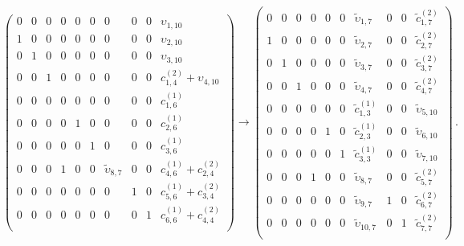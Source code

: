 \documentclass[10pt]{article}
\theoremstyle{definition}
\numberwithin{equation}{section}
\begin{document}
\begin{equation}
	\begin{pmatrix}
		0 & 0 & 0 & 0 & 0 & 0 & 0 & 0 & 0 & \upsilon _{1,10} \\
		1 & 0 & 0 & 0 & 0 & 0 & 0 & 0 & 0 & \upsilon _{2,10} \\
		0 & 1 & 0 & 0 & 0 & 0 & 0 & 0 & 0 & \upsilon _{3,10} \\
		0 & 0 & 1 & 0 & 0 & 0 & 0 & 0 & 0 & c_{1,4}^{(2)}+\upsilon _{4,10} \\
		0 & 0 & 0 & 0 & 0 & 0 & 0 & 0 & 0 & c_{1,6}^{(1)} \\
		0 & 0 & 0 & 0 & 1 & 0 & 0 & 0 & 0 & c_{2,6}^{(1)} \\
		0 & 0 & 0 & 0 & 0 & 1 & 0 & 0 & 0 & c_{3,6}^{(1)} \\
		0 & 0 & 0 & 1 & 0 & 0 & \tilde\upsilon _{8,7} & 0 & 0 & c_{4,6}^{(1)}+c_{2,4}^{(2)} \\
		0 & 0 & 0 & 0 & 0 & 0 & 0 & 1 & 0 & c_{5,6}^{(1)}+c_{3,4}^{(2)} \\
		0 & 0 & 0 & 0 & 0 & 0 & 0 & 0 & 1 & c_{6,6}^{(1)}+c_{4,4}^{(2)} \\
	\end{pmatrix}\to\begin{pmatrix}
		0 & 0 & 0 & 0 & 0 & 0 & \tilde\upsilon _{1,7} & 0 & 0 & \tilde c_{1,7}^{(2)} \\
		1 & 0 & 0 & 0 & 0 & 0 & \tilde\upsilon _{2,7} & 0 & 0 & \tilde c_{2,7}^{(2)} \\
		0 & 1 & 0 & 0 & 0 & 0 & \tilde\upsilon _{3,7} & 0 & 0 & \tilde c_{3,7}^{(2)} \\
		0 & 0 & 1 & 0 & 0 & 0 & \tilde\upsilon _{4,7} & 0 & 0 & \tilde c_{4,7}^{(2)} \\
		0 & 0 & 0 & 0 & 0 & 0 & \tilde c_{1,3}^{(1)} & 0 & 0 & \tilde\upsilon _{5,10} \\
		0 & 0 & 0 & 0 & 1 & 0 & \tilde c_{2,3}^{(1)} & 0 & 0 & \tilde\upsilon _{6,10} \\
		0 & 0 & 0 & 0 & 0 & 1 & \tilde c_{3,3}^{(1)} & 0 & 0 & \tilde\upsilon _{7,10} \\
		0 & 0 & 0 & 1 & 0 & 0 & \tilde\upsilon _{8,7} & 0 & 0 & \tilde c_{5,7}^{(2)} \\
		0 & 0 & 0 & 0 & 0 & 0 & \tilde\upsilon _{9,7} & 1 & 0 & \tilde c_{6,7}^{(2)} \\
		0 & 0 & 0 & 0 & 0 & 0 & \tilde\upsilon _{10,7} & 0 & 1 & \tilde c_{7,7}^{(2)} \\
	\end{pmatrix}\,.
\end{equation}
\end{document}

